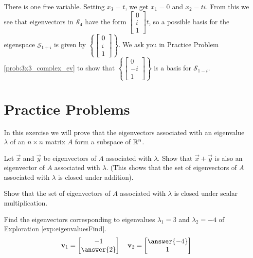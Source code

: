 \documentclass{ximera}
\begin{document}
\begin{example}
\begin{explanation}
\begin{align*}
\end{align*}
There is one free variable.  Setting $x_3=t$, we get $x_1=0$ and $x_2=ti$.  From this we see that eigenvectors in $\mathcal{S}_4$ have the form $\begin{bmatrix}0\\i\\1\end{bmatrix}t$, so a possible basis for the eigenspace $\mathcal{S}_{1+i}$ is given by $\left\{\begin{bmatrix}0\\i\\1\end{bmatrix}\right\}$.
We ask you in Practice Problem \ref{prob:3x3_complex_ev} to show that $\left\{\begin{bmatrix}0\\-i\\1\end{bmatrix}\right\}$ is a basis for $\mathcal{S}_{1-i}$.
\end{explanation}
\end{example}

\section*{Practice Problems}

\begin{problem}
In this exercise we will prove that the eigenvectors associated with an eigenvalue $\lambda$ of an $n \times n$ matrix $A$ form a subspace of $\mathbb{R}^n$.
\begin{problem}\label{prob:eigenspace1}
Let $\vec{x}$ and $\vec{y}$ be eigenvectors of $A$ associated with $\lambda$.  Show that $\vec{x}+\vec{y}$ is also an eigenvector of $A$ associated with $\lambda$.  (This shows that the set of eigenvectors of $A$ associated with $\lambda$ is closed under addition).
\end{problem}
\begin{problem}\label{prob:eigenspace2}
Show that the set of eigenvectors of $A$ associated with $\lambda$ is closed under scalar multiplication.
\end{problem}
\end{problem}

\begin{problem}\label{prob:eigenExploration}
    Find the eigenvectors corresponding to eigenvalues $\lambda_1=3$ and $\lambda_2=-4$ of Exploration \ref{exp:eigenvaluesFind}.
    $$\vec{v}_1=\begin{bmatrix}-1\\\answer{2}\end{bmatrix}\quad \vec{v}_2=\begin{bmatrix}\answer{-4}\\1\end{bmatrix}$$
\end{problem}
\end{document}
